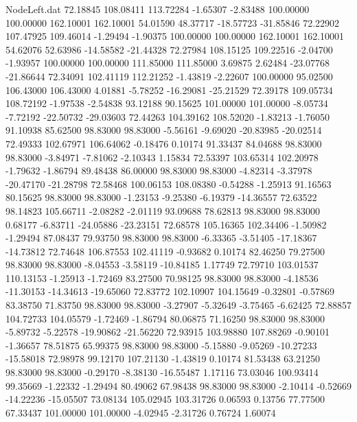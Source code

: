\begin{filecontents}{NodeLeft.dat}
  72.18845  108.08411  113.72284    -1.65307   -2.83488  100.00000  100.00000  162.10001  162.10001   54.01590   48.37717  -18.57723  -31.85846
  72.22902  107.47925  109.46014    -1.29494   -1.90375  100.00000  100.00000  162.10001  162.10001   54.62076   52.63986  -14.58582  -21.44328
  72.27984  108.15125  109.22516    -2.04700   -1.93957  100.00000  100.00000  111.85000  111.85000    3.69875    2.62484  -23.07768  -21.86644
  72.34091  102.41119  112.21252    -1.43819   -2.22607  100.00000   95.02500  106.43000  106.43000    4.01881   -5.78252  -16.29081  -25.21529
  72.39178  109.05734  108.72192    -1.97538   -2.54838   93.12188   90.15625  101.00000  101.00000   -8.05734   -7.72192  -22.50732  -29.03603
  72.44263  104.39162  108.52020    -1.83213   -1.76050   91.10938   85.62500   98.83000   98.83000   -5.56161   -9.69020  -20.83985  -20.02514
  72.49333  102.67971  106.64062    -0.18476    0.10174   91.33437   84.04688   98.83000   98.83000   -3.84971   -7.81062   -2.10343    1.15834
  72.53397  103.65314  102.20978    -1.79632   -1.86794   89.48438   86.00000   98.83000   98.83000   -4.82314   -3.37978  -20.47170  -21.28798
  72.58468  100.06153  108.08380    -0.54288   -1.25913   91.16563   80.15625   98.83000   98.83000   -1.23153   -9.25380   -6.19379  -14.36557
  72.63522   98.14823  105.66711    -2.08282   -2.01119   93.09688   78.62813   98.83000   98.83000    0.68177   -6.83711  -24.05886  -23.23151
  72.68578  105.16365  102.34406    -1.50982   -1.29494   87.08437   79.93750   98.83000   98.83000   -6.33365   -3.51405  -17.18367  -14.73812
  72.74648  106.87553  102.41119    -0.93682    0.10174   82.46250   79.27500   98.83000   98.83000   -8.04553   -3.58119  -10.84185    1.17749
  72.79710  103.01537  110.13153    -1.25913   -1.72469   83.27500   70.98125   98.83000   98.83000   -4.18536  -11.30153  -14.34613  -19.65060
  72.83772  102.10907  104.15649    -0.32801   -0.57869   83.38750   71.83750   98.83000   98.83000   -3.27907   -5.32649   -3.75465   -6.62425
  72.88857  104.72733  104.05579    -1.72469   -1.86794   80.06875   71.16250   98.83000   98.83000   -5.89732   -5.22578  -19.90862  -21.56220
  72.93915  103.98880  107.88269    -0.90101   -1.36657   78.51875   65.99375   98.83000   98.83000   -5.15880   -9.05269  -10.27233  -15.58018
  72.98978   99.12170  107.21130    -1.43819    0.10174   81.53438   63.21250   98.83000   98.83000   -0.29170   -8.38130  -16.55487    1.17116
  73.03046  100.93414   99.35669    -1.22332   -1.29494   80.49062   67.98438   98.83000   98.83000   -2.10414   -0.52669  -14.22236  -15.05507
  73.08134  105.02945  103.31726     0.06593    0.13756   77.77500   67.33437  101.00000  101.00000   -4.02945   -2.31726    0.76724    1.60074

\end{filecontents}
